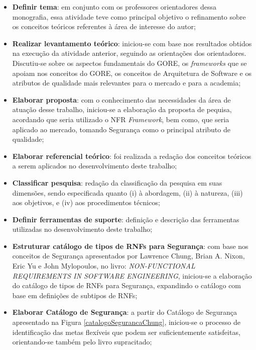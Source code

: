 \begin{itemize}
	\item \textbf{Definir tema}: em conjunto com os professores orientadores dessa monografia, essa atividade teve como principal objetivo o refinamento sobre os conceitos teóricos referentes à área de interesse do autor;
	
	\item \textbf{Realizar levantamento teórico}: iniciou-se com base nos resultados obtidos na execução da atividade anterior, seguindo as orientações dos orientadores. Discutiu-se sobre os aspectos fundamentais do GORE, os \textit{frameworks} que se apoiam nos conceitos do GORE, os conceitos de Arquitetura de Software e os atributos de qualidade mais relevantes para o mercado e para a academia;
	
	\item \textbf{Elaborar proposta}: com o conhecimento das necessidades da área de atuação desse trabalho, iniciou-se a elaboração da proposta de pequisa, acordando que seria utilizado o NFR \textit{Framework}, bem como, que seria aplicado ao mercado, tomando Segurança como o principal atributo de qualidade;  
	
	\item \textbf{Elaborar referencial teórico}: foi realizada a redação dos conceitos teóricos a serem aplicados no desenvolvimento deste trabalho; 
	
	\item \textbf{Classificar pesquisa}: redação  da classificação da pesquisa em suas dimensões, sendo especificada quanto (i) à abordagem, (ii) à natureza, (iii) aos objetivos, e (iv) aos procedimentos técnicos;
	
	\item \textbf{Definir ferramentas de suporte}: definição e descrição das ferramentas utilizadas no desenvolvimento deste trabalho;
	
	\item \textbf{Estruturar catálogo de tipos de RNFs para Segurança}: com base nos conceitos de Segurança apresentados por Lawrence Chung, Brian A. Nixon, Eric Yu e John Mylopoulos, no  livro: \textit{NON-FUNCTIONAL REQUIREMENTS IN SOFTWARE ENGINEERING}, iniciou-se a elaboração do catálogo de tipos de RNFs para Segurança, expandindo o catálogo com base em definições de subtipos de RNFs;
	
	\item \textbf{Elaborar Catálogo de Segurança}: a partir do Catálogo de Segurança apresentado na Figura \ref{catalogoSegurancaChung}, iniciou-se o processo de identificação das metas flexíveis que podem ser suficientemente satisfeitas, orientando-se também pelo livro supracitado;
	

\end{itemize}

